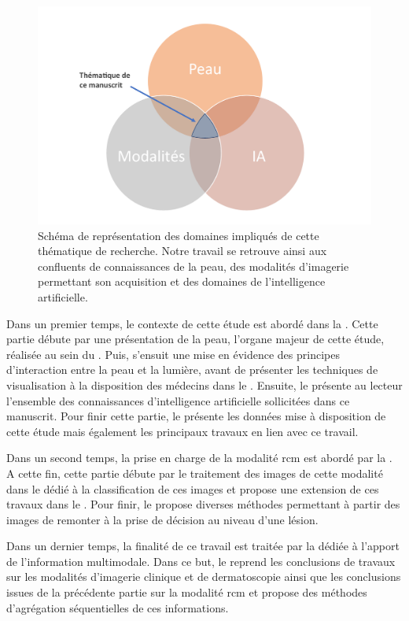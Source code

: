 \begin{figure}[H]
    \centering
    \includegraphics[width=0.8\linewidth]{contents/i_introduction/resources/scheme_our_work.pdf}
    \caption{Schéma de représentation des domaines impliqués de cette thématique de recherche. Notre travail se retrouve ainsi aux confluents de connaissances de la peau, des modalités d'imagerie permettant son acquisition et des domaines de l'intelligence artificielle.}
    \label{fig:scheme_our_work}
\end{figure}\par

Dans un premier temps, le contexte de cette étude est abordé dans la . Cette partie débute par une présentation de la peau, l'organe majeur de cette étude, réalisée au sein du . Puis, s'ensuit une mise en évidence des principes d'interaction entre la peau et la lumière, avant de présenter les techniques de visualisation à la disposition des médecins dans le . Ensuite, le  présente au lecteur l'ensemble des connaissances d'intelligence artificielle sollicitées dans ce manuscrit. Pour finir cette partie, le  présente les données mise à disposition de cette étude mais également les principaux travaux en lien avec ce travail.\par

Dans un second temps, la prise en charge de la modalité \gls{rcm} est abordé par la . A cette fin, cette partie débute par le traitement des images de cette modalité dans le  dédié à la classification de ces images et propose une extension de ces travaux dans le . Pour finir, le  propose diverses méthodes permettant à partir des images de remonter à la prise de décision au niveau d'une lésion.\par

Dans un dernier temps, la finalité de ce travail est traitée par la  dédiée à l'apport de l'information multimodale. Dans ce but, le  reprend les conclusions de travaux sur les modalités d'imagerie clinique et de dermatoscopie ainsi que les conclusions issues de la précédente partie sur la modalité \gls{rcm} et propose des méthodes d'agrégation séquentielles de ces informations.\par